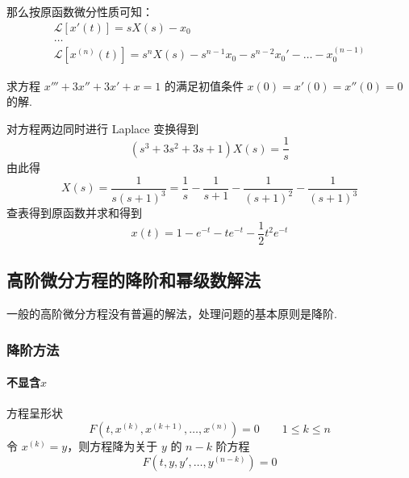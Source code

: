 那么按原函数微分性质可知：
\begin{gather}
    \mathscr{L}[x'(t)]=sX(s)-x_{0} \\
    \dots \\
    \mathscr{L}[x^{(n)}(t)]=s ^{n}X(s)-s ^{n-1}x_{0}-s ^{n-2}x_{0}'-\dots-x_{0}^{(n-1)}
\end{gather}
\begin{exercise}
    求方程 $\displaystyle x'''+3x''+3x'+x=1$ 的满足初值条件 $\displaystyle x(0)=x'(0)=x''(0)=0$ 的解.
\end{exercise}
\begin{solution}
    对方程两边同时进行 Laplace 变换得到
    $$
        (s^{3}+3s^{2}+3s+1)X(s)=\frac{1}{s}
    $$
    由此得
    $$
        X(s)=\frac{1}{s(s+1)^{3}}=\frac{1}{s}-\frac{1}{s+1}-\frac{1}{(s+1)^{2}}-\frac{1}{(s+1)^{3}}
    $$
    查表得到原函数并求和得到
    $$
        x(t)=1-e^{ -t }-te^{ -t }-\frac{1}{2}t^{2}e^{ -t }
    $$
\end{solution}
\subsection{高阶微分方程的降阶和幂级数解法}

一般的高阶微分方程没有普遍的解法，处理问题的基本原则是降阶.

\subsubsection{降阶方法}

\paragraph{不显含$x$}
方程呈形状
$$
    F(t,x^{(k)},x^{(k+1)},\dots,x^{(n)})=0\qquad 1\leq k\leq n
$$
令 $\displaystyle x^{(k)}=y$，则方程降为关于 $y$ 的 $\displaystyle n-k$ 阶方程
$$
    F(t,y,y',\dots,y^{(n-k)})=0
$$
